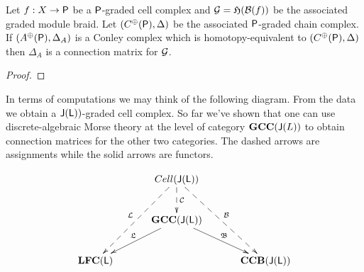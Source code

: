 \begin{thm}
Let $f:X\to {\mathsf P}$ be a ${\mathsf P}$-graded cell complex and ${\mathcal G} = \mathfrak{H}({\mathcal B}(f))$ be the associated graded module braid.  Let $(C^\oplus({\mathsf P}),\Delta)$ be the associated ${\mathsf P}$-graded chain complex.  If $(A^\oplus({\mathsf P}),\Delta_A)$ is a Conley complex which is homotopy-equivalent to $(C^\oplus({\mathsf P}),\Delta)$ then $\Delta_A$ is a connection matrix for ${\mathcal G}$.
\end{thm}
\begin{proof}




%
% 
% 
% 

\end{proof}


In terms of computations we may think of the following diagram.  From the data we obtain a ${\mathsf J}({\mathsf L}))$-graded cell complex.  So far we've shown that one can use discrete-algebraic Morse theory at the level of category ${\bf GCC}({\mathsf J}(L))$ to obtain connection matrices for the other two categories.  The dashed arrows are assignments while the solid arrows are functors.

\[
\xymatrixrowsep{0.35in}
\xymatrixcolsep{0.45in}
\xymatrix{
& & Cell(\sJ(\sL)) \ar@{-->}[d]^{\cC} \ar@{-->}[ddl]_{\cL} \ar@{-->}[ddr]^{\cB} & &  \\
& & {\bf GCC}(\sJ(\sL)) \ar[dl]_{\mathfrak{L}} \ar[dr]^{\mathfrak{B}} & &  \\
&\bCF(\sL)  & &  {\bf CCB(\sJ(\sL))}&
}
\]


